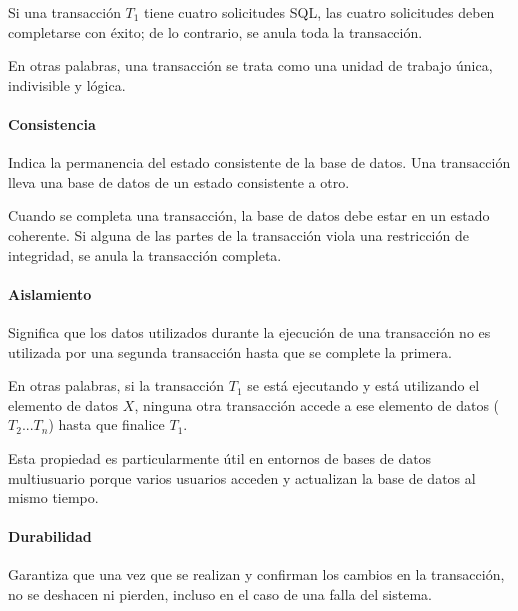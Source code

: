 Si una transacción $T_{1}$ tiene cuatro solicitudes SQL, las cuatro solicitudes deben completarse con éxito; de lo contrario, se anula toda la transacción.


En otras palabras, una transacción se trata como una unidad de trabajo única, indivisible y lógica.
\paragraph*{Consistencia}
Indica la permanencia del estado consistente de la base de datos. Una transacción lleva una base de datos de un estado consistente a otro. 


Cuando se completa una transacción, la base de datos debe estar en un estado coherente. Si alguna de las partes de la transacción viola una restricción de integridad, se anula la transacción completa.
\paragraph*{Aislamiento}
Significa que los datos utilizados durante la ejecución de una transacción no es utilizada por una segunda transacción hasta que se complete la primera. 


En otras palabras, si la transacción $T_{1}$ se está ejecutando y está utilizando el elemento de datos $X$, ninguna otra transacción accede a ese elemento de datos ($T_{2}...T_{n}$) hasta que finalice $T_{1}$.


Esta propiedad es particularmente útil en entornos de bases de datos multiusuario porque varios usuarios acceden y actualizan la base de datos al mismo tiempo.
\paragraph*{Durabilidad}

Garantiza que una vez que se realizan y confirman los cambios en la transacción, no se deshacen ni pierden, incluso en el caso de una falla del sistema.